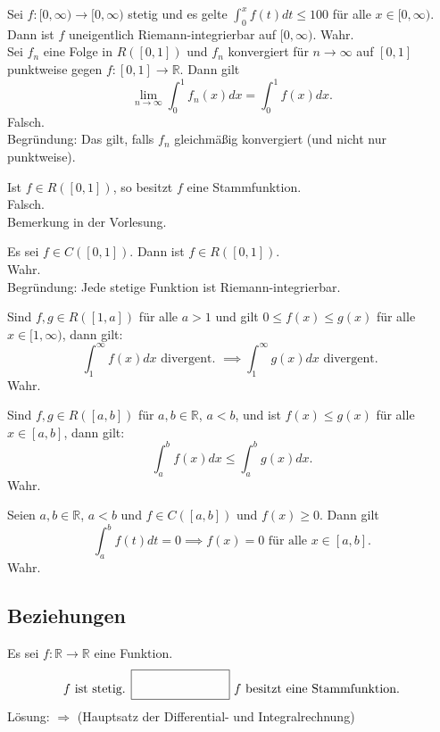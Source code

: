 Sei $f : [0, \infty)\to [0,\infty)$ stetig und es gelte $\int_{0}^{x} f(t)dt \leq 100$ für alle $x \in [0, \infty)$.
Dann ist $f$ uneigentlich Riemann-integrierbar auf $[0,\infty)$.
Wahr.\\

Sei $f_n$ eine Folge in $R([0,1])$ und $f_n$ konvergiert für $n \to \infty$ auf $[0,1]$ punktweise gegen $f: [0,1] \to \mathbb{R}$.
Dann gilt
\begin{displaymath}
  \lim_{n \to \infty} \int_{0}^{1} f_n(x)dx = \int_{0}^{1} f(x)dx.
\end{displaymath}
Falsch.\\
Begründung: Das gilt, falls $f_n$ gleichmäßig konvergiert (und nicht nur punktweise).

Ist $f \in R([0,1])$, so besitzt $f$ eine Stammfunktion.\\
Falsch.\\
Bemerkung in der Vorlesung.

Es sei $f \in C([0,1])$.
Dann ist $f \in R([0,1])$.\\
Wahr.\\
Begründung: Jede stetige Funktion ist Riemann-integrierbar.

Sind $f,g \in R([1,a])$ für alle $a > 1$ und gilt $0 \leq f(x) \leq g(x)$ für alle $x \in [1,\infty)$, dann gilt:
\begin{displaymath}
  \int_{1}^{\infty} f(x) dx \text{ divergent. } \implies \int_{1}^{\infty} g(x) dx \text{ divergent. }
\end{displaymath}
Wahr.

Sind $f,g \in R([a,b])$ für $a,b \in \mathbb{R}$, $a < b$, und ist $f(x) \leq g(x)$ für alle $x \in [a,b]$, dann gilt:
\begin{displaymath}
  \int_{a}^{b} f(x) dx \leq \int_{a}^{b} g(x) dx.
\end{displaymath}
Wahr.

Seien $a,b \in \mathbb{R}$, $a < b$ und $f \in C([a,b])$ und $f(x) \geq 0$.
Dann gilt
\begin{displaymath}
  \int_{a}^{b} f(t) dt = 0 \implies f(x) = 0 \text{ für alle } x \in [a,b].
\end{displaymath}
Wahr.

\subsection{Beziehungen}
Es sei $f: \mathbb{R} \to \mathbb{R}$ eine Funktion.
\begin{displaymath}
  f \text{ ist stetig. } \fbox{\rule{1in}{0pt}\rule[-0.5ex]{0pt}{4ex}} \text{ $f$ besitzt eine Stammfunktion.}
\end{displaymath}
Lösung: $\Rightarrow$ (Hauptsatz der Differential- und Integralrechnung)